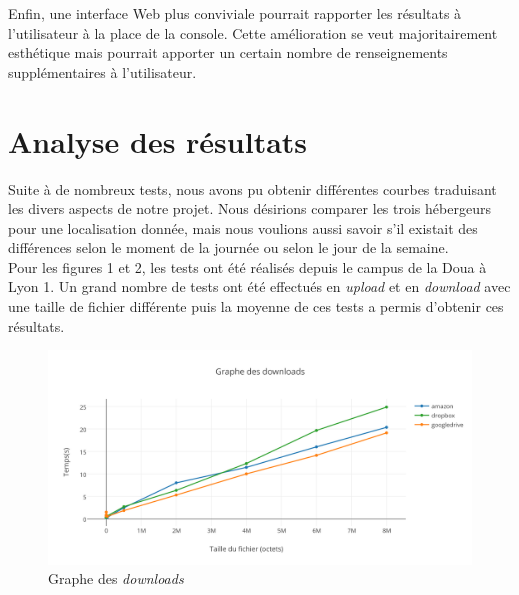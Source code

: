 \documentclass[10pt]{article}
\begin{document}
Enfin, une interface Web plus conviviale
pourrait rapporter les résultats à l'utilisateur à la place de la
console. Cette amélioration se veut majoritairement esthétique mais
pourrait apporter un certain nombre de renseignements supplémentaires
à l'utilisateur.

\section{Analyse des résultats}

Suite à de nombreux tests, nous avons pu obtenir différentes courbes traduisant
les divers aspects de notre projet. Nous désirions comparer les trois hébergeurs
pour une localisation donnée, mais nous voulions aussi savoir s'il existait des
différences selon le moment de la journée ou selon le jour de la semaine.\\

Pour les figures 1 et 2, les tests ont été réalisés depuis le campus de la Doua
à Lyon 1. Un grand nombre de tests ont été effectués en \textit{upload} et en
\textit{download} avec une taille de fichier différente puis la moyenne de ces
tests a permis d'obtenir ces résultats.

\begin{figure}[h] \centering
\includegraphics[scale=0.7]{graphe_des_downloads.png} \caption{Graphe des
\textit{downloads}} \end{figure}

\newpage
\end{document}
